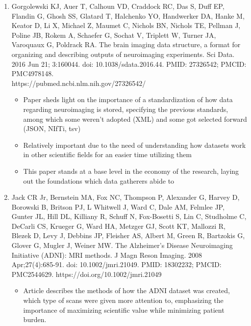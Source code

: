 \documentclass[a4paper]{article}
\begin{document}
\begin{enumerate}
      \item Gorgolewski KJ, Auer T, Calhoun VD, Craddock RC, Das S, Duff EP, Flandin G, Ghosh SS, Glatard T,
            Halchenko YO, Handwerker DA, Hanke M, Keator D, Li X, Michael Z, Maumet C, Nichols BN, Nichols TE, Pellman J,
            Poline JB, Rokem A, Schaefer G, Sochat V, Triplett W, Turner JA, Varoquaux G, Poldrack RA. The brain imaging
            data structure, a format for organizing and describing outputs of neuroimaging experiments. Sci Data. 2016 Jun 21;
            3:160044. doi: 10.1038/sdata.2016.44. PMID: 27326542; PMCID: PMC4978148. \\
            https://pubmed.ncbi.nlm.nih.gov/27326542/
            \begin{itemize}
                  \item Paper sheds light on the importance of a standardization of how data regarding neuroimaging is stored,
                        specifying the previous standards, among which some weren't adopted (XML) and some got selected forward (JSON, NIfTi, tsv)
                  \item Relatively important due to the need of understanding how datasets work in other scientific fields for an easier
                        time utilizing them
                  \item This paper stands at a base level in the economy of the research, laying out the foundations which data gatherers
                        abide to
            \end{itemize}
            \newpage
      \item Jack CR Jr, Bernstein MA, Fox NC, Thompson P, Alexander G, Harvey D, Borowski B, Britson PJ, L Whitwell J, Ward C,
            Dale AM, Felmlee JP, Gunter JL, Hill DL, Killiany R, Schuff N, Fox-Bosetti S, Lin C, Studholme C, DeCarli CS, Krueger G,
            Ward HA, Metzger GJ, Scott KT, Mallozzi R, Blezek D, Levy J, Debbins JP, Fleisher AS, Albert M, Green R, Bartzokis G,
            Glover G, Mugler J, Weiner MW. The Alzheimer's Disease Neuroimaging Initiative (ADNI): MRI methods. J Magn Reson Imaging.
            2008 Apr;27(4):685-91. doi: 10.1002/jmri.21049. PMID: 18302232; PMCID: PMC2544629. https://doi.org/10.1002/jmri.21049
            \begin{itemize}
                  \item Article describes the methods of how the ADNI dataset was created, which type of scans were given more attention to,
                        emphasizing the importance of maximizing scientific value while minimizing patient burden.

\end{itemize}
\end{enumerate}
\end{document}
